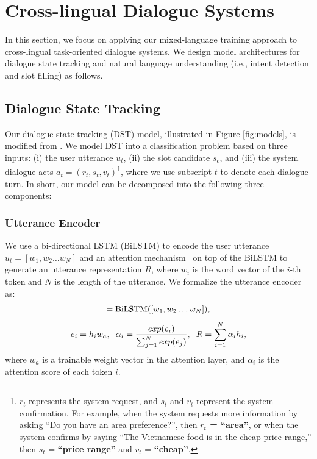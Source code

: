 \documentclass[letterpaper]{article} %
\newcommand{\citet}[1]{\citeauthor{#1} \shortcite{#1}}
\begin{document}
\section{Cross-lingual Dialogue Systems}
In this section, we focus on applying our mixed-language training approach to cross-lingual task-oriented dialogue systems. We design model architectures for dialogue state tracking and natural language understanding (i.e., intent detection and slot filling) as follows.

\subsection{Dialogue State Tracking}
Our dialogue state tracking (DST) model, illustrated in Figure \ref{fig:models}, is modified from \citet{chen2018xl}. We model DST into a classification problem based on three inputs: (i) the user utterance $ u_t $, (ii) the slot candidate $ s_c $, and (iii) the system dialogue acts $ a_t = (r_t, s_t, v_t) $\footnote{$r_t$ represents the system request, and $s_t$ and $v_t$ represent the system confirmation. For example, when the system requests more information by asking ``Do you have an area preference?'', then \textbf{$r_t$ = ``area''}, or when the system confirms by saying ``The Vietnamese food is in the cheap price range,'' then $s_t$ = \textbf{``price range''} and $v_t$ = \textbf{``cheap''}.}, where we use subscript $t$ to denote each dialogue turn. In short, our model can be decomposed into the following three components:

\subsubsection{Utterance Encoder}
We use a bi-directional LSTM (BiLSTM) to encode the user utterance $u_t=[w_1, w_2 \dots w_N]$ and an attention mechanism~\cite{felbo2017using} on top of the BiLSTM to generate an utterance representation $R$, where $w_i$ is the word vector of the $i$-th token and $N$ is the length of the utterance. We formalize the utterance encoder as:
\begin{equation}
    [h_1, h_2 \dots h_N] = \textnormal{BiLSTM}([w_1, w_2 \dots  w_N]),
\end{equation}
\begin{equation} \label{eq5}
    e_i = h_i w_a, \hspace{2mm}
    \alpha_i = \frac{exp(e_i)}{\sum_{j=1}^N exp(e_j)}, \hspace{2mm} R = \sum_{i=1}^N \alpha_i h_i,
\end{equation}
where $w_a$ is a trainable weight vector in the attention layer, and $\alpha_i$ is the attention score of each token $i$.
\end{document}
